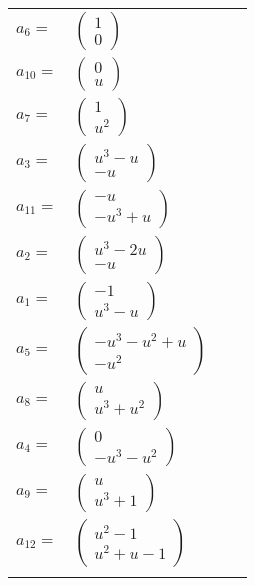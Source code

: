 \documentclass[1p]{elsarticle_modified}
\theoremstyle{definition}
\begin{document}
\begin{tabular}{m{7pt} m{180pt} m{7pt} m{180pt} }
\flushright $a_{6}=$&$\begin{pmatrix}1\\0\end{pmatrix}$ \\
\flushright $a_{10}=$&$\begin{pmatrix}0\\u\end{pmatrix}$ \\
\flushright $a_{7}=$&$\begin{pmatrix}1\\u^2\end{pmatrix}$ \\
\flushright $a_{3}=$&$\begin{pmatrix}u^3- u\\- u\end{pmatrix}$ \\
\flushright $a_{11}=$&$\begin{pmatrix}- u\\- u^3+u\end{pmatrix}$ \\
\flushright $a_{2}=$&$\begin{pmatrix}u^3-2 u\\- u\end{pmatrix}$ \\
\flushright $a_{1}=$&$\begin{pmatrix}-1\\u^3- u\end{pmatrix}$ \\
\flushright $a_{5}=$&$\begin{pmatrix}- u^3- u^2+u\\- u^2\end{pmatrix}$ \\
\flushright $a_{8}=$&$\begin{pmatrix}u\\u^3+u^2\end{pmatrix}$ \\
\flushright $a_{4}=$&$\begin{pmatrix}0\\- u^3- u^2\end{pmatrix}$ \\
\flushright $a_{9}=$&$\begin{pmatrix}u\\u^3+1\end{pmatrix}$ \\
\flushright $a_{12}=$&$\begin{pmatrix}u^2-1\\u^2+u-1\end{pmatrix}$\\&\end{tabular}
\end{document}
